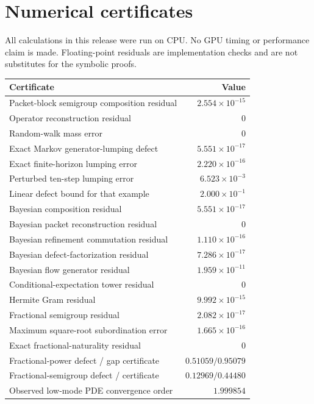 \documentclass[11pt]{article}
\theoremstyle{definition}
\theoremstyle{remark}
\begin{document}
\section{Numerical certificates}

All calculations in this release were run on CPU. No GPU timing or performance claim is made. Floating-point residuals are implementation checks and are not substitutes for the symbolic proofs.

\begin{table}[htbp]
\centering
\small
\begin{tabular}{L{0.56\textwidth} r}
\toprule
Certificate & Value\\
\midrule
Packet-block semigroup composition residual & $2.554\times10^{-15}$\\
Operator reconstruction residual & $0$\\
Random-walk mass error & $0$\\
Exact Markov generator-lumping defect & $5.551\times10^{-17}$\\
Exact finite-horizon lumping error & $2.220\times10^{-16}$\\
Perturbed ten-step lumping error & $6.523\times10^{-3}$\\
Linear defect bound for that example & $2.000\times10^{-1}$\\
Bayesian composition residual & $5.551\times10^{-17}$\\
Bayesian packet reconstruction residual & $0$\\
Bayesian refinement commutation residual & $1.110\times10^{-16}$\\
Bayesian defect-factorization residual & $7.286\times10^{-17}$\\
Bayesian flow generator residual & $1.959\times10^{-11}$\\
Conditional-expectation tower residual & $0$\\
Hermite Gram residual & $9.992\times10^{-15}$\\
Fractional semigroup residual & $2.082\times10^{-17}$\\
Maximum square-root subordination error & $1.665\times10^{-16}$\\
Exact fractional-naturality residual & $0$\\
Fractional-power defect / gap certificate & $0.51059 / 0.95079$\\
Fractional-semigroup defect / certificate & $0.12969 / 0.44480$\\
Observed low-mode PDE convergence order & $1.999854$\\

\end{tabular}
\end{table}
\end{document}
